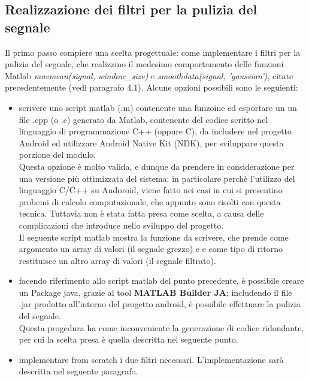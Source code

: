 \documentclass[a4paper, oneside]{book}
\begin{document}
\subsection{Realizzazione dei filtri per la pulizia del segnale}
Il primo passo compiere una scelta progettuale: come implementare i filtri per la pulizia del segnale, che realizzino il medesimo comportamento delle funzioni Matlab \textit{movmean(signal, window\_size)} e \textit{smoothdata(signal, 'gaussian')}, citate precedentemente (vedi paragrafo 4.1). Alcune opzioni possibili sono le seguienti: 
\begin{itemize}
\item {scrivere uno script matlab (.m) contenente una funzoine ed esportare un un file .cpp (o .c) generato da Matlab, contenente del codice scritto nel linguaggio di programmazione C++ (oppure C), da includere nel progetto Android ed utilizzare Android Native Kit (NDK), per sviluppare questa porzione del modulo. \\
Questa opzione è molto valida, e dunque da prendere in considerazione per una versione più ottimizzata del sistema; in particolare perchè l'utilizzo del linguaggio C/C++ su Andoroid, viene fatto nei casi in cui si presentino probemi di calcolo computazionale, che appunto sono risolti con questa tecnica. 
Tuttavia non è stata fatta presa come scelta, a causa delle complicazioni che introduce nello sviluppo del progetto.\\
Il seguente script matlab mostra la funzione da scrivere, che prende come argomento un array di valori (il segnale grezzo) e e come tipo di ritorno restituisce un altro array di valori (il segnale filtrato).\\
}
\item{facendo riferimento allo script matlab del punto precedente, è possibile creare un Package java, grazie al tool \textbf{MATLAB Builder JA}; includendo il file .jar prodotto all'interno del progetto android, è possibile effettuare la pulizia del segnale. \\
Questa progedura ha come inconveniente la generazione di codice ridondante, per cui la scelta presa è quella descritta nel seguente punto.}
\item{implementare from scratch i due filtri necessari. L'implementazione sarà descritta nel seguente paragrafo.}
\end{itemize}

\end{document}
